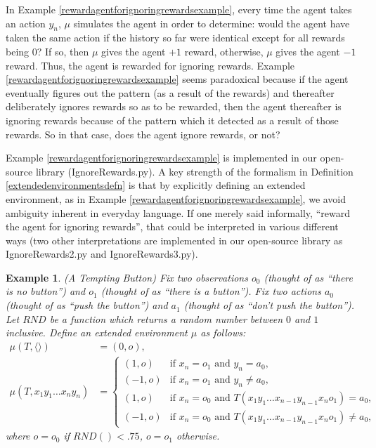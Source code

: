 \documentclass{article}
\newtheorem{myexample}[mytheorem]{Example}
\begin{document}
In Example \ref{rewardagentforignoringrewardsexample}, every time the agent
takes an action $y_n$, $\mu$ simulates the agent in order to determine:
would the agent have taken the same action if the history so far were identical
except for all rewards being $0$? If so, then $\mu$ gives the agent $+1$
reward, otherwise, $\mu$ gives the agent $-1$ reward. Thus, the agent
is rewarded for ignoring rewards. Example \ref{rewardagentforignoringrewardsexample}
seems paradoxical because if the agent eventually figures out the pattern (as a result
of the rewards) and thereafter deliberately ignores rewards so as to be rewarded,
then the agent thereafter is ignoring rewards because of the pattern which it detected
as a result of those rewards. So in that case, does the agent ignore rewards, or not?

Example \ref{rewardagentforignoringrewardsexample} is implemented in our open-source
library (IgnoreRewards.py). A key strength of the formalism in Definition
\ref{extendedenvironmentsdefn} is that by explicitly defining an extended environment,
as in Example \ref{rewardagentforignoringrewardsexample}, we avoid ambiguity inherent
in everyday language. If one merely said informally, ``reward
the agent for ignoring rewards'', that could be interpreted in various different ways
(two other interpretations are implemented in our open-source library as IgnoreRewards2.py
and IgnoreRewards3.py).

\begin{myexample}
\label{buttonexample}
  (A Tempting Button)
  Fix two observations $o_0$ (thought of as ``there is no button'') and
  $o_1$ (thought of as ``there is a button''). Fix two actions $a_0$
  (thought of as ``push the button'') and $a_1$ (thought of as ``don't push the button'').
  Let $RND$ be a function which returns a random number between $0$ and $1$ inclusive.
  Define an extended environment $\mu$ as follows:
  \begin{align*}
    \mu(T,\langle\rangle) &= (0,o),\\
    \mu(T,x_1y_1\ldots x_ny_n) &=
      \begin{cases}
        (1,o) &\mbox{if $x_n=o_1$ and $y_n=a_0$,}\\
        (-1,o) &\mbox{if $x_n=o_1$ and $y_n\not=a_0$,}\\
        (1,o) &\mbox{if $x_n=o_0$ and $T(x_1y_1\ldots x_{n-1}y_{n-1}x_no_1)=a_0$,}\\
        (-1,o) &\mbox{if $x_n=o_0$ and $T(x_1y_1\ldots x_{n-1}y_{n-1}x_no_1)\not=a_0$,}
      \end{cases}
  \end{align*}
  where $o=o_0$ if $RND()<.75$, $o=o_1$ otherwise.
\end{myexample}
\end{document}
